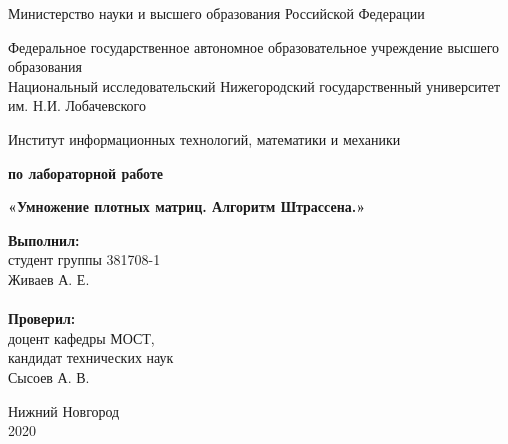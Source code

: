 \documentclass{report}
\begin{document}
\begin{titlepage}

\begin{center}
Министерство науки и высшего образования Российской Федерации
\end{center}

\begin{center}
Федеральное государственное автономное образовательное учреждение высшего образования \\
Национальный исследовательский Нижегородский государственный университет им. Н.И. Лобачевского
\end{center}

\begin{center}
Институт информационных технологий, математики и механики
\end{center}

\vspace{4em}

\begin{center}
\textbf{ по лабораторной работе} \\
\end{center}
\begin{center}
\textbf{\Large«Умножение плотных матриц. Алгоритм Штрассена.»} \\
\end{center}

\vspace{4em}

\newbox{\lbox}
\newlength{\maxl}
\setlength{\maxl}{\wd\lbox}
\hfill\parbox{7cm}{
\hspace*{5cm}\hspace*{-5cm}\textbf{Выполнил:} \\ студент группы 381708-1 \\ Живаев А. Е.\\
\\
\hspace*{5cm}\hspace*{-5cm}\textbf{Проверил:}\\ доцент кафедры МОСТ, \\ кандидат технических наук \\ Сысоев А. В.
}

\vspace{\fill}

\begin{center} Нижний Новгород \\ 2020 \end{center}

\end{titlepage}
\setcounter{page}{2}
\end{document}
